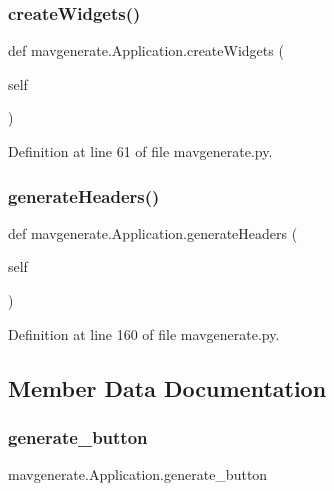 \subsubsection{\texorpdfstring{createWidgets()}{createWidgets()}}
{\footnotesize\ttfamily def mavgenerate.\+Application.\+create\+Widgets (\begin{DoxyParamCaption}\item[{}]{self }\end{DoxyParamCaption})}



Definition at line 61 of file mavgenerate.\+py.

\mbox{\label{classmavgenerate_1_1Application_a1643cb62a9d7374557f6c04bace5092a}} 
\subsubsection{\texorpdfstring{generateHeaders()}{generateHeaders()}}
{\footnotesize\ttfamily def mavgenerate.\+Application.\+generate\+Headers (\begin{DoxyParamCaption}\item[{}]{self }\end{DoxyParamCaption})}



Definition at line 160 of file mavgenerate.\+py.



\subsection{Member Data Documentation}
\mbox{\label{classmavgenerate_1_1Application_a14066b479ea2e2a37d3864af10149410}} 
\subsubsection{\texorpdfstring{generate\_button}{generate\_button}}
{\footnotesize\ttfamily mavgenerate.\+Application.\+generate\+\_\+button}



